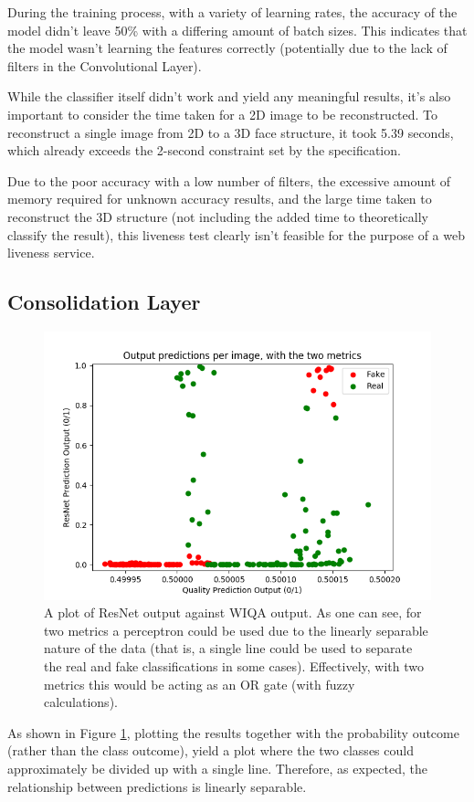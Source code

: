 \documentclass[10pt,a4paper]{article}
\begin{document}
    During the training process, with a variety of learning rates, the accuracy of the model didn't leave 50\% with a differing amount of batch sizes. This indicates that the model wasn't learning the features correctly (potentially due to the lack of filters in the Convolutional Layer).
    
    While the classifier itself didn't work and yield any meaningful results, it's also important to consider the time taken for a 2D image to be reconstructed. 
    To reconstruct a single image from 2D to a 3D face structure, it took 5.39 seconds, which already exceeds the 2-second constraint set by the specification.

    Due to the poor accuracy with a low number of filters, the excessive amount of memory required for unknown accuracy results, and the large time taken to reconstruct the 3D structure (not including the added time to theoretically classify the result),
    this liveness test clearly isn't feasible for the purpose of a web liveness service.

    \subsection{Consolidation Layer}
        
        \begin{figure}
            \centering
            \includegraphics[width=.5\linewidth]{LinearlySeparable.png}
            \caption{A plot of ResNet output against WIQA output. As one can see, for two metrics a perceptron could be used due to the linearly separable nature of the data (that is, a single line could be used to
            separate the real and fake classifications in some cases). Effectively, with two metrics this would be acting as an OR gate (with fuzzy calculations).}
            \label{LinearlySeparableGraph}
        \end{figure}
    
        As shown in Figure \ref{LinearlySeparableGraph}, plotting the results together with the probability outcome (rather than the class outcome),
        yield a plot where the two classes could approximately be divided up with a single line. Therefore, as expected, the relationship between predictions is linearly separable.
\end{document}
